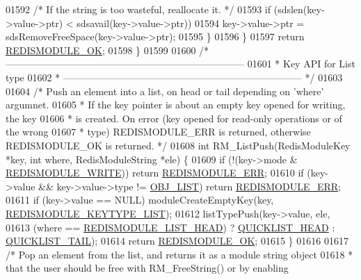 \begin{DoxyCode}
{{{01592             \textcolor{comment}{/* If the string is too wasteful, reallocate it. */}
01593             \textcolor{keywordflow}{if} (sdslen(key->value->ptr) < sdsavail(key->value->ptr))
01594                 key->value->ptr = sdsRemoveFreeSpace(key->value->ptr);
01595         \}
01596     \}
01597     \textcolor{keywordflow}{return} \hyperlink{redismodule_8h_a1bc5bfd69abcd378ff52c640adc5418d}{REDISMODULE\_OK};
01598 \}
01599 
01600 \textcolor{comment}{/* --------------------------------------------------------------------------}
01601 \textcolor{comment}{ * Key API for List type}
01602 \textcolor{comment}{ * -------------------------------------------------------------------------- */}
01603 
01604 \textcolor{comment}{/* Push an element into a list, on head or tail depending on 'where' argumnet.}
01605 \textcolor{comment}{ * If the key pointer is about an empty key opened for writing, the key}
01606 \textcolor{comment}{ * is created. On error (key opened for read-only operations or of the wrong}
01607 \textcolor{comment}{ * type) REDISMODULE\_ERR is returned, otherwise REDISMODULE\_OK is returned. */}
01608 \textcolor{keywordtype}{int} RM\_ListPush(RedisModuleKey *key, \textcolor{keywordtype}{int} where, RedisModuleString *ele) \{
01609     \textcolor{keywordflow}{if} (!(key->mode & \hyperlink{redismodule_8h_a73b37117ef94cb4a904361afcc51b6b4}{REDISMODULE\_WRITE})) \textcolor{keywordflow}{return} 
      \hyperlink{redismodule_8h_a3df6f5bd5247289e66f44437a7cddd49}{REDISMODULE\_ERR};
01610     \textcolor{keywordflow}{if} (key->value && key->value->type != \hyperlink{server_8h_a4a5f22a280949c97a0cb0d4213275126}{OBJ\_LIST}) \textcolor{keywordflow}{return} 
      \hyperlink{redismodule_8h_a3df6f5bd5247289e66f44437a7cddd49}{REDISMODULE\_ERR};
01611     \textcolor{keywordflow}{if} (key->value == NULL) moduleCreateEmptyKey(key,
      \hyperlink{redismodule_8h_a4c01058971d9d8fe1cfa02071fa87fa6}{REDISMODULE\_KEYTYPE\_LIST});
01612     listTypePush(key->value, ele,
01613         (where == \hyperlink{redismodule_8h_a6ca6298fda4f019c7585d34b870fd5f1}{REDISMODULE\_LIST\_HEAD}) ? 
      \hyperlink{quicklist_8h_a4cbe05838d62e8d1c8bfa46c9f1b083a}{QUICKLIST\_HEAD} : \hyperlink{quicklist_8h_a602bad1be3a6abb2a66ef87387cb7698}{QUICKLIST\_TAIL});
01614     \textcolor{keywordflow}{return} \hyperlink{redismodule_8h_a1bc5bfd69abcd378ff52c640adc5418d}{REDISMODULE\_OK};
01615 \}
01616 
01617 \textcolor{comment}{/* Pop an element from the list, and returns it as a module string object}
01618 \textcolor{comment}{ * that the user should be free with RM\_FreeString() or by enabling}
}}}
\end{DoxyCode}
